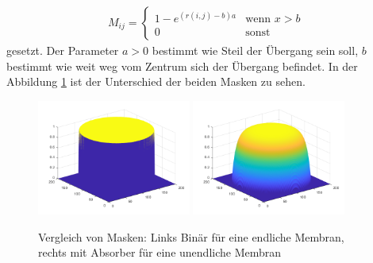 \begin{align}
	M_{ij} = \begin{cases} 1-e^{(r(i,j)-b)a} & \text{wenn $x > b$} \\
		0 & \text{sonst} \end{cases}
\end{align}
gesetzt.
Der Parameter $a > 0$ bestimmt wie Steil der Übergang sein soll, $b$ bestimmt  wie weit weg vom Zentrum sich der Übergang befindet.
In der Abbildung \ref{kreismembran:im:masks} ist der Unterschied der beiden Masken zu sehen. 
\begin{figure}
	
	\begin{center}
		
		\includegraphics[width=0.45\textwidth]{papers/kreismembran/images/mask_disk.png}
		\includegraphics[width=0.45\textwidth]{papers/kreismembran/images/mask_absorber.png}
		\caption{Vergleich von Masken: Links Binär für eine endliche Membran, rechts mit Absorber für eine unendliche Membran}
		\label{kreismembran:im:masks}
	\end{center}	
\end{figure} 
